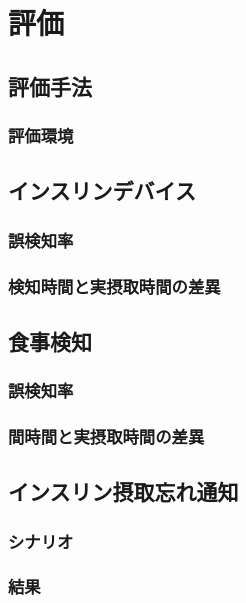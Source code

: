 \chapter{評価}
\label{chap:evaluation}

\section{評価手法}

\subsection{評価環境}

\section{インスリンデバイス}

\subsection{誤検知率}

\subsection{検知時間と実摂取時間の差異}

\section{食事検知}

\subsection{誤検知率}

\subsection{間時間と実摂取時間の差異}

\section{インスリン摂取忘れ通知}

\subsection{シナリオ}

\subsection{結果}


